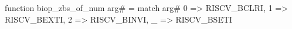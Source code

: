 function biop_zbs_of_num arg# = match arg# {
  0 => RISCV_BCLRI,
  1 => RISCV_BEXTI,
  2 => RISCV_BINVI,
  _ => RISCV_BSETI
}
